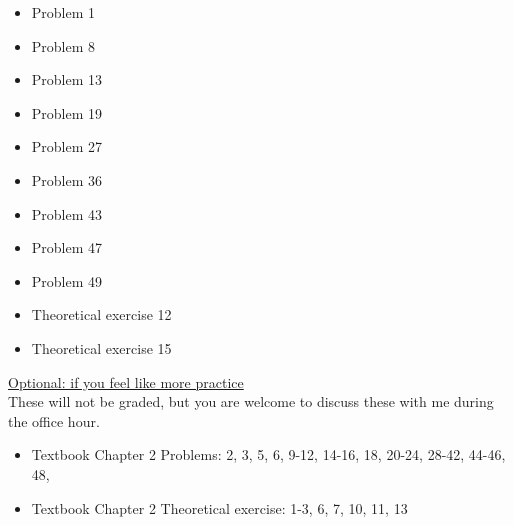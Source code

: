 \documentclass[11pt]{article}
\begin{document}
\begin{itemize}


    \item
    Problem 1
    \item
    Problem 8

    \item
    Problem  13

    \item
    Problem  19

    \item
    Problem  27

    \item
    Problem  36

    \item
    Problem  43

    \item
    Problem  47

    \item
    Problem  49


    \item
    Theoretical exercise 12

    \item
    Theoretical exercise 15



\end{itemize}


\vspace{12pt}

\underline{Optional: if you feel like more practice}\\
These will not be graded, but you are welcome to discuss these with me during the office hour.

\begin{itemize}


\item Textbook  Chapter 2 Problems: 2, 3, 5, 6, 9-12, 14-16, 18, 20-24, 28-42, 44-46, 48,
\item Textbook  Chapter 2 Theoretical exercise: 1-3, 6, 7, 10, 11, 13

\end{itemize}
\end{document}
